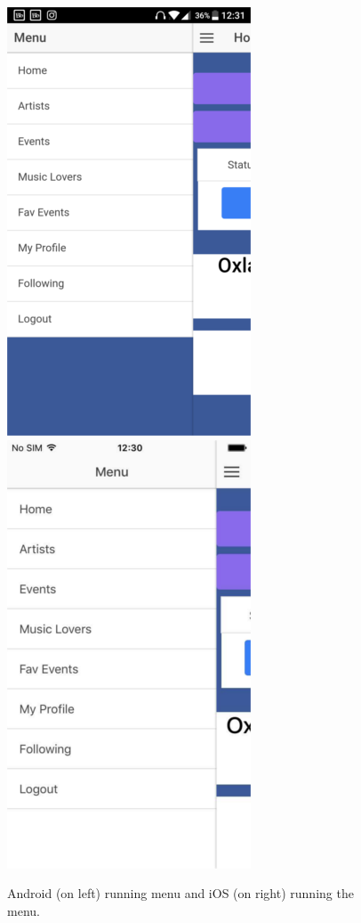 \begin{center}
\begin{figure} [H]
\begin{center}
\includegraphics[scale=0.45]{images/android}
\includegraphics[scale=0.45]{images/ios}
\end{center}
\caption{Android (on left) running menu and iOS (on right) running the menu.}
\end{figure}
\end{center}

